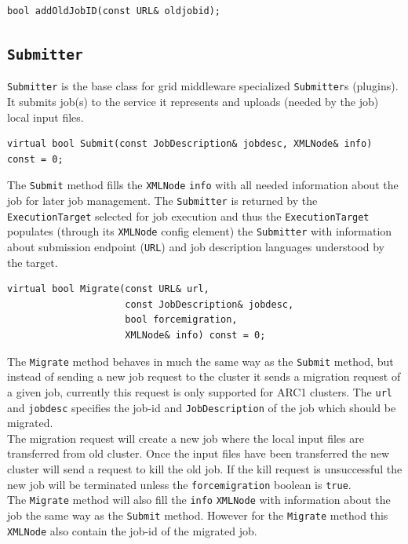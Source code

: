 \documentclass{book}
\newcommand{\ExecutionTarget}{\texttt{ExecutionTarget}}
\newcommand{\JobDescription}{\texttt{JobDescription}}
\newcommand{\Submitter}{\texttt{Submitter}}
\newcommand{\URL}{\texttt{URL}}
\newcommand{\XMLNode}{\texttt{XMLNode}}
\begin{document}
\begin{shaded}
\begin{verbatim}
bool addOldJobID(const URL& oldjobid);
\end{verbatim}
\end{shaded}

\subsection{{\Submitter}}

{\Submitter} is the base class for grid middleware specialized {\Submitter}s (plugins).
It submits job(s) to the service it represents and uploads (needed by the job) local 
input files.

\begin{shaded}
\begin{verbatim}
virtual bool Submit(const JobDescription& jobdesc, XMLNode& info) const = 0;
\end{verbatim}
\end{shaded}

The \texttt{Submit} method fills the {\XMLNode} \texttt{info} with all
needed information about the job for later job management. The
{\Submitter} is returned by the {\ExecutionTarget} selected for job
execution and thus the {\ExecutionTarget} populates (through its
{\XMLNode} config element) the {\Submitter} with information about
submission endpoint ({\URL}) and job description languages understood
by the target.

\begin{shaded}
\begin{verbatim}
virtual bool Migrate(const URL& url,
                     const JobDescription& jobdesc,
                     bool forcemigration,
                     XMLNode& info) const = 0;
\end{verbatim}
\end{shaded}

The \texttt{Migrate} method behaves in much the same way as the \texttt{Submit}
method, but instead of sending a new job request to the cluster it sends a 
migration request of a given job, currently this request is only supported 
for ARC1 clusters. The \texttt{url} and \texttt{jobdesc} specifies the job-id 
and {\JobDescription} of the job which should be migrated.\\
The migration request will create a new job where the local input files are 
transferred from old cluster. Once the input files have been transferred the 
new cluster will send a request to kill the old job. If the kill request is 
unsuccessful the new job will be terminated unless the \texttt{forcemigration} 
boolean is \texttt{true}.\\
The \texttt{Migrate} method will also fill the \texttt{info} {\XMLNode} with 
information about the job the same way as the \texttt{Submit} method. However 
for the \texttt{Migrate} method this \texttt{XMLNode} also contain the job-id 
of the migrated job.
\end{document}
